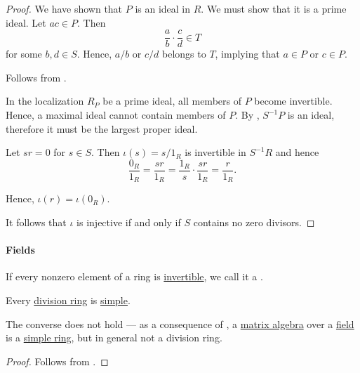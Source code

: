 \begin{proof}
  We have shown that \( P \) is an ideal in \( R \). We must show that it is a prime ideal. Let \( ac \in P \). Then
  \begin{equation*}
    \frac a b \cdot \frac c d \in T
  \end{equation*}
  for some \( b, d \in S \). Hence, \( a / b \) or \( c / d \) belongs to \( T \), implying that \( a \in P \) or \( c \in P \).

   Follows from .

   In the localization \( R_P \) be a prime ideal, all members of \( P \) become invertible. Hence, a maximal ideal cannot contain members of \( P \). By , \( S^{-1} P \) is an ideal, therefore it must be the largest proper ideal.

   Let \( sr = 0 \) for \( s \in S \). Then \( \iota(s) = s / 1_R \) is invertible in \( S^{-1} R \) and hence
  \begin{equation*}
    \frac {0_R} {1_R}
    =
    \frac {sr} {1_R}
    =
    \frac {1_R} s \cdot \frac {sr} {1_R}
    =
    \frac r {1_R}.
  \end{equation*}

  Hence, \( \iota(r) = \iota(0_R) \).

  It follows that \( \iota \) is injective if and only if \( S \) contains no zero divisors.
\end{proof}

\paragraph{Fields}

\begin{definition}\label{def:division_ring}
  If every nonzero element of a ring is \hyperref[def:divisibility/unit]{invertible}, we call it a .
\end{definition}

\begin{proposition}\label{thm:division_ring_is_simple}
  Every \hyperref[def:division_ring]{division ring} is \hyperref[def:simple_object]{simple}.
\end{proposition}
\begin{comments}
  \item The converse does not hold --- as a consequence of , a \hyperref[thm:matrix_algebra]{matrix algebra} over a \hyperref[def:field]{field} is a \hyperref[def:simple_object]{simple ring}, but in general not a division ring.
\end{comments}
\begin{proof}
  Follows from .
\end{proof}

